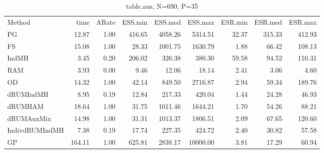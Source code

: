\begin{table}
\begin{tabular}{l r r r r r r r r } 
          Method  &     time &    ARate &  ESS.min &  ESS.med &  ESS.max &  ESR.min &  ESR.med &  ESR.max \\ 
              PG  &    12.87 &     1.00 &   416.65 &  4058.26 &  5314.51 &    32.37 &   315.33 &   412.93 \\ 
              FS  &    15.08 &     1.00 &    28.33 &  1001.75 &  1630.79 &     1.88 &    66.42 &   108.13 \\ 
           IndMH  &     3.45 &     0.20 &   206.02 &   326.38 &   380.30 &    59.58 &    94.52 &   110.31 \\ 
             RAM  &     3.93 &     0.00 &     9.46 &    12.06 &    18.14 &     2.41 &     3.06 &     4.60 \\ 
              OD  &    14.32 &     1.00 &    42.14 &   849.50 &  2716.87 &     2.94 &    59.34 &   189.76 \\ 
       dRUMIndMH  &     8.95 &     0.19 &    12.84 &   217.33 &   420.04 &     1.44 &    24.28 &    46.93 \\ 
         dRUMHAM  &    18.64 &     1.00 &    31.75 &  1011.46 &  1644.21 &     1.70 &    54.26 &    88.21 \\ 
      dRUMAuxMix  &    14.98 &     1.00 &    31.31 &  1013.37 &  1806.51 &     2.09 &    67.65 &   120.60 \\ 
  IndivdRUMIndMH  &     7.38 &     0.19 &    17.74 &   227.35 &   424.72 &     2.40 &    30.82 &    57.58 \\ 
              GP  &   164.11 &     1.00 &   625.81 &  2838.17 & 10000.00 &     3.81 &    17.29 &    60.94
 \end{tabular}
\caption{table.aus, N=690, P=35}
\end{table}

